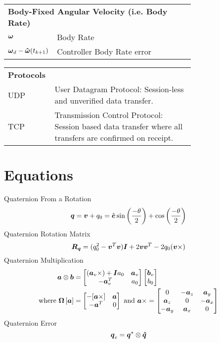 \begin{nomenclature}
\begin{tabular}{lp{0.75\linewidth}}
  \multicolumn{2}{l}{\textbf{Body-Fixed Angular Velocity (i.e. Body Rate)}} \\
  $\boldsymbol{\omega}$ & Body Rate \\
  $\boldsymbol{\omega}_d - \boldsymbol{\hat{\omega}}(t_{k+1})$ & Controller Body Rate error \\
\end{tabular}

\begin{tabular}{lp{0.75\linewidth}}
  \multicolumn{2}{l}{\textbf{Protocols}} \\
  UDP & User Datagram Protocol: Session-less and unverified data transfer. \\
  TCP & Transmission Control Protocol: Session based data transfer where all transfers are confirmed on receipt. \\
\end{tabular}

\section{Equations}
Quaternion From a Rotation
\begin{equation} \boldsymbol{q} = \boldsymbol{v} + q_0 = \hat{\boldsymbol{e}} \sin \left( \frac{-\theta}{2} \right) + \cos \left( \frac{-\theta}{2} \right) \end{equation}
Quaternion Rotation Matrix
\begin{equation}
  \boldsymbol{R_q} = (q_0^2 - \boldsymbol{v}^T \boldsymbol{v}) \boldsymbol{I} + 2 \boldsymbol{v} \boldsymbol{v}^T - 2 q_0 (\boldsymbol{v} \times)
\end{equation}
Quaternion Multiplication
\begin{equation}
  \begin{aligned}
    \boldsymbol{a} \otimes \boldsymbol{b} &=
    \begin{bmatrix}
      (\boldsymbol{a}_v \times) + \boldsymbol{I} a_0 & \boldsymbol{a}_v \\
      -\boldsymbol{a}_v^T                    & a_0 \\
    \end{bmatrix}
    \begin{bmatrix}
    \boldsymbol{b}_v \\ b_0
    \end{bmatrix} \\
    \text{where } \boldsymbol{\Omega} \left[ \boldsymbol{a} \right] &=
    \begin{bmatrix}
      - [ \boldsymbol{a} \times ] & \boldsymbol{a} \\
      - \boldsymbol{a}^T & 0
    \end{bmatrix} \text{ and }
    \boldsymbol{a} \times =
    \begin{bmatrix}
      0 & -\boldsymbol{a}_z & \boldsymbol{a}_y \\
      \boldsymbol{a}_z & 0 & -\boldsymbol{a}_x \\
      -\boldsymbol{a}_y & \boldsymbol{a}_x & 0 \\
    \end{bmatrix}
  \end{aligned}
\end{equation}
Quaternion Error
\begin{equation}
  \boldsymbol{q}_e = \boldsymbol{q}^* \otimes \boldsymbol{\hat{q}}
\end{equation}


\end{nomenclature}
